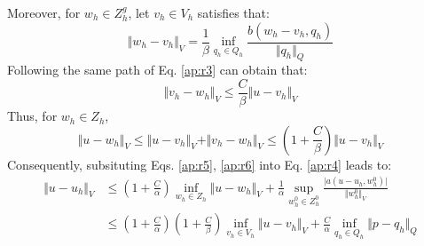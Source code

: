 Moreover, for $w_h \in Z^g_h$, let $v_h\in V_h$ satisfies that:
\begin{equation}
    \Vert w_h-v_h \Vert_V =\frac{1}{\beta} \inf_{q_h \in Q_h} \frac{b(w_h-v_h,q_h)}{\Vert q_h \Vert_Q}
\end{equation}
Following the same path of Eq. \eqref{ap:r3} can obtain that:
\begin{equation}
\Vert v_h-w_h \Vert_V \le\frac{C}{\beta} \Vert u-v_h \Vert_V
\end{equation}
Thus, for $w_h \in Z_h$,
\begin{equation}\label{ap:r6}
\Vert u-w_h \Vert_V \le \Vert u-v_h \Vert_V + \Vert v_h-w_h \Vert_V \le (1+\frac{C}{\beta})\Vert u-v_h \Vert_V
\end{equation}
Consequently, subsituting Eqs. \eqref{ap:r5}, \eqref{ap:r6} into Eq. \eqref{ap:r4} leads to:
\begin{equation}
\begin{split}
\Vert u-u_h \Vert_V &\le (1+\frac{C}{\alpha}) \inf_{w_h \in Z_h}\Vert u-w_h \Vert_V + \frac{1}{\alpha}\sup_{w^0_h \in Z^0_h} \frac{\vert a(u-u_h,w^0_h) \vert}{\Vert w^0_h \Vert_V} \\
&\le(1+\frac{C}{\alpha})(1+\frac{C}{\beta}) \inf_{v_h \in V_h} \Vert u-v_h \Vert_V +\frac{C}{\alpha} \inf_{q_h \in Q_h} \Vert p-q_h \Vert_Q
\end{split}
\end{equation}



